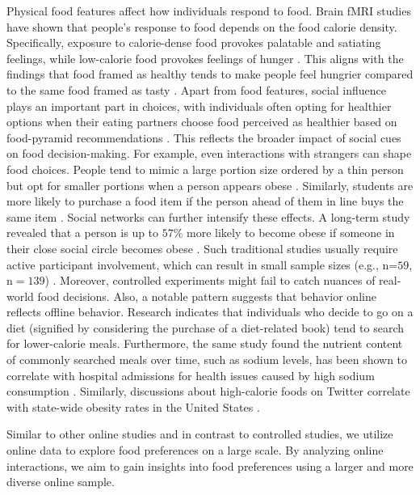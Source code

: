  Physical food features affect how individuals respond to food.
Brain fMRI studies have shown that people's response to food depends on the food calorie density. 
Specifically, exposure to calorie-dense food provokes palatable and satiating feelings, while low-calorie food provokes feelings of hunger \cite{killgore_affect_2006, killgore_cortical_2003}.
This aligns with the findings that food framed as healthy tends to make people feel hungrier compared to the same food framed as tasty \cite{finkelstein_when_2010}.
Apart from food features, social influence plays an important part in choices, with individuals often opting for healthier options when their eating partners choose food perceived as healthier based on food-pyramid recommendations \cite{gligoric_formation_2021}. 
This reflects the broader impact of social cues on food decision-making.
For example, even interactions with strangers can shape food choices.
People tend to mimic a large portion size ordered by a thin person but opt for smaller portions when a person appears obese \cite{mcferran_ill_2010}.
Similarly, students are more likely to purchase a food item if the person ahead of them in line buys the same item \cite{gligoric_food_2024}.
Social networks can further intensify these effects. 
A long-term study revealed that a person is up to $57$\% more likely to become obese if someone in their close social circle becomes obese \cite{christakis_spread_2007}.
Such traditional studies usually require active participant involvement, which can result in small sample sizes (e.g., n=$59$, n$=139$) \cite{houben_guilty_2010, serrano-gonzalez_developmental_2021}.
Moreover, controlled experiments might fail to catch nuances of real-world food decisions.
Also, a notable pattern suggests that behavior online reflects offline behavior.
Research indicates that individuals who decide to go on a diet (signified by considering the purchase of a diet-related book) tend to search for lower-calorie meals.
Furthermore, the same study found the nutrient content of commonly searched meals over time, such as sodium levels, has been shown to correlate with hospital admissions for health issues caused by high sodium consumption \cite{west_cookies_2013}.
Similarly, discussions about high-calorie foods on Twitter correlate with state-wide obesity rates in the United States \cite{abbar_you_2015}. 

Similar to other online studies and in contrast to controlled studies, we utilize online data to explore food preferences on a large scale.
By analyzing online interactions, we aim to gain insights into food preferences using a larger and more diverse online sample.

